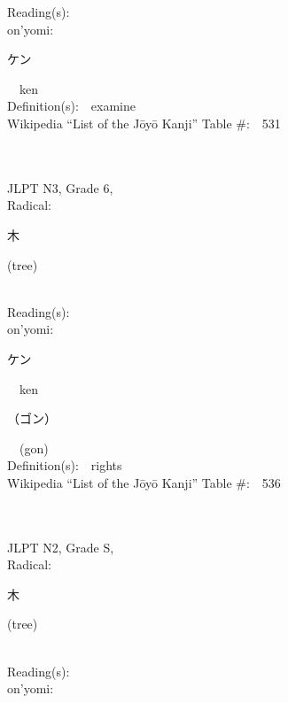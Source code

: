 \begin{multicols}{2}
Reading(s):\ \ \\
{\hspace*{1em}}on'yomi:\ \ \\
{\hspace*{2em}}{\begin{CJK}{UTF8}{min} ケン \end{CJK}}\ \ ken\ \ \\
Definition(s):\ \ examine \\
Wikipedia ``List of the J\=oy\=o Kanji'' Table \#:\ \ 531 \\
\ \ \\
{\fontsize{34pt}{40pt}  }\ \ \\  %
{JLPT N3, Grade 6, \\Radical:\ \ {\begin{CJK}{UTF8}{min} 木 \end{CJK}} (tree) } \\
Reading(s):\ \ \\
{\hspace*{1em}}on'yomi:\ \ \\
{\hspace*{2em}}{\begin{CJK}{UTF8}{min} ケン \end{CJK}}\ \ ken\ \ \\
{\hspace*{2em}}{\begin{CJK}{UTF8}{min} （ゴン） \end{CJK}}\ \ (gon)\ \ \\
Definition(s):\ \ rights \\
Wikipedia ``List of the J\=oy\=o Kanji'' Table \#:\ \ 536 \\
\ \ \\
{\fontsize{34pt}{40pt}  }\ \ \\  %
{JLPT N2, Grade S, \\Radical:\ \ {\begin{CJK}{UTF8}{min} 木 \end{CJK}} (tree) } \\
Reading(s):\ \ \\
{\hspace*{1em}}on'yomi:\ \ \\

\end{multicols}
